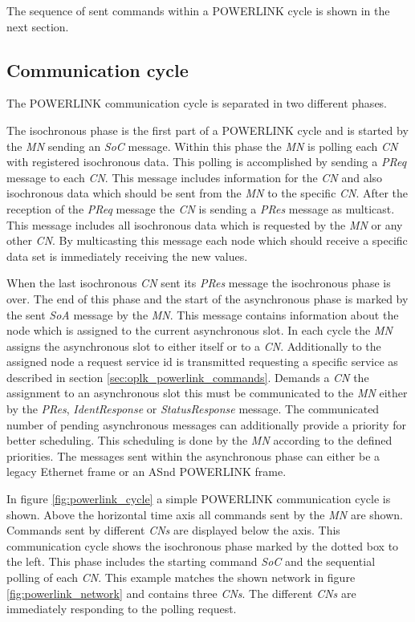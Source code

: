 The sequence of sent commands within a POWERLINK cycle is shown in the next section.

\subsection{Communication cycle}
\label{sec:oplk_powerlink_commcycle}

The POWERLINK communication cycle is separated in two different phases.

The isochronous phase is the first part of a POWERLINK cycle and is started by the \emph{MN} sending an \emph{SoC} message.
Within this phase the \emph{MN} is polling each \emph{CN} with registered isochronous data.
This polling is accomplished by sending a \emph{PReq} message to each \emph{CN}.
This message includes information for the \emph{CN} and also isochronous data which should be sent from the \emph{MN} to the specific \emph{CN}.
After the reception of the \emph{PReq} message the \emph{CN} is sending a \emph{PRes} message as multicast.
This message includes all isochronous data which is requested by the \emph{MN} or any other \emph{CN}.
By multicasting this message each node which should receive a specific data set is immediately receiving the new values. \cite[section 4.2.4.1.1]{epsg_epsg_2013}

When the last isochronous \emph{CN} sent its \emph{PRes} message the isochronous phase is over.
The end of this phase and the start of the asynchronous phase is marked by the sent \emph{SoA} message by the \emph{MN}.
This message contains information about the node which is assigned to the current asynchronous slot.
In each cycle the \emph{MN} assigns the asynchronous slot to either itself or to a \emph{CN}.
Additionally to the assigned node a request service id is transmitted requesting a specific service as described in section \ref{sec:oplk_powerlink_commands}.
Demands a \emph{CN} the assignment to an asynchronous slot this must be communicated to the \emph{MN} either by the \emph{PRes}, \emph{IdentResponse} or \emph{StatusResponse} message.
The communicated number of pending asynchronous messages can additionally provide a priority for better scheduling.
This scheduling is done by the \emph{MN} according to the defined priorities.
The messages sent within the asynchronous phase can either be a legacy Ethernet frame or an ASnd POWERLINK frame. \cite[section 4.2.4.1.2]{epsg_epsg_2013}

In figure \ref{fig:powerlink_cycle} a simple POWERLINK communication cycle is shown.
Above the horizontal time axis all commands sent by the \emph{MN} are shown.
Commands sent by different \emph{CNs} are displayed below the axis.
This communication cycle shows the isochronous phase marked by the dotted box to the left.
This phase includes the starting command \emph{SoC} and the sequential polling of each \emph{CN}.
This example matches the shown network in figure \ref{fig:powerlink_network} and contains three \emph{CNs}.
The different \emph{CNs} are immediately responding to the polling request.

